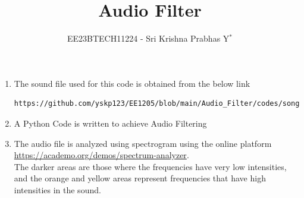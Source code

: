 \documentclass[journal,12pt,twocolumn]{IEEEtran}
\theoremstyle{remark}
\begin{document}

\vspace{3cm}
\title{Audio Filter}
\author{EE23BTECH11224 - Sri Krishna Prabhas Y$^{*}$%
}
\maketitle
\newpage
\bigskip
\renewcommand{\thefigure}{\arabic{figure}}
\renewcommand{\thetable}{\theenumi}


\begin{enumerate}[label=\thesection.\arabic*
,ref=\thesection.\theenumi]
\section{Digital Filter}
\label{input_sound}
\item The sound file used for this code is obtained from the below link
\begin{lstlisting}
https://github.com/yskp123/EE1205/blob/main/Audio_Filter/codes/song.wav
\end{lstlisting}
\item 
\label{Python code}
A Python Code is written to achieve Audio Filtering 
\label{prob:audio_filter_problem}

\item 
\label{Visualization}

The audio file is analyzed using spectrogram using the online platform \href{https://academo.org/demos/spectrum-analyzer}{\url{https://academo.org/demos/spectrum-analyzer}}.\\

The darker areas are those where the frequencies have very low intensities, and the orange and yellow areas represent frequencies that have high intensities in the sound.



\end{enumerate}
\end{document}
